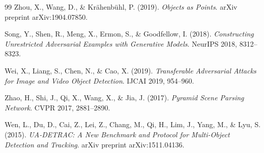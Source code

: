\documentclass[12pt,a4paper]{report}
\begin{document}
\begin{thebibliography}{99}
Zhou, X., Wang, D., \& Krähenbühl, P. (2019).
\textit{Objects as Points}.
arXiv preprint arXiv:1904.07850.

Song, Y., Shen, R., Meng, X., Ermon, S., \& Goodfellow, I. (2018).
\textit{Constructing Unrestricted Adversarial Examples with Generative Models}.
NeurIPS 2018, 8312--8323.

Wei, X., Liang, S., Chen, N., \& Cao, X. (2019).
\textit{Transferable Adversarial Attacks for Image and Video Object Detection}.
IJCAI 2019, 954--960.

Zhao, H., Shi, J., Qi, X., Wang, X., \& Jia, J. (2017).
\textit{Pyramid Scene Parsing Network}.
CVPR 2017, 2881--2890.

Wen, L., Du, D., Cai, Z., Lei, Z., Chang, M., Qi, H., Lim, J., Yang, M., \& Lyu, S. (2015).
\textit{UA-DETRAC: A New Benchmark and Protocol for Multi-Object Detection and Tracking}.
arXiv preprint arXiv:1511.04136.

\end{thebibliography}
\end{document}
